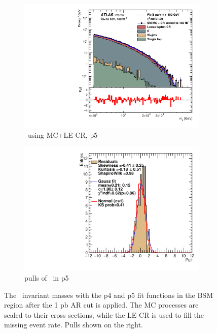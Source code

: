 \begin{figure}[ht]
\begin{subfigure}[h]{0.38\linewidth}
    \includegraphics[scale=0.3]{figs/ch6/fit/variable_nosmooth/p5/1PB/output_SMMCplusCR_Mjj_p5.pdf}%
     \caption{\mjj \ using MC+LE-CR, p5}
     \end{subfigure}
     \hfill
    \begin{subfigure}[h]{0.4\linewidth}
    \includegraphics[scale=0.32]{figs/ch6/fit/variable_nosmooth/p5/1PB/pull_SMMCplusCR_Mjj_p5.pdf}%
    \caption{pulls of \mjj \ in p5}
    \end{subfigure}
    \caption{The \mjj \ invariant masses with the p4 and p5 fit functions in the BSM region after the 1 pb AR cut is applied. The MC processes are scaled to their cross sections, while the LE-CR is used to fill the missing event rate. Pulls shown on the right.}
\label{fig:mjj-fit-pulls-1pb}
\end{figure}

